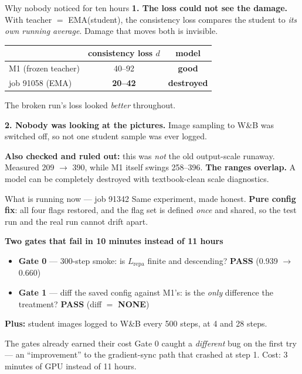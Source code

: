 \documentclass[10pt,aspectratio=169]{beamer}
\newcommand{\good}[1]{\textcolor{good}{\textbf{#1}}}
\newcommand{\bad}[1]{\textcolor{bad}{\textbf{#1}}}
\begin{document}
\begin{frame}{Why nobody noticed for ten hours}
  \textbf{1. The loss could not see the damage.}
  With teacher $=$ EMA(student), the consistency loss compares the student to
  \emph{its own running average}. Damage that moves both is invisible.

  \begin{center}
  \begin{tabular}{lcc}
    \toprule
    & consistency loss $d$ & model \\
    \midrule
    M1 (frozen teacher) & 40--92 & \good{good} \\
    job 91058 (EMA)     & \textbf{20--42} & \bad{destroyed} \\
    \bottomrule
  \end{tabular}
  \end{center}
  The broken run's loss looked \emph{better} throughout.

  \vspace{0.8em}
  \textbf{2. Nobody was looking at the pictures.} Image sampling to W\&B was switched off,
  so not one student sample was ever logged.

  \vspace{0.8em}
  \textbf{Also checked and ruled out:} this was \emph{not} the old output-scale runaway.
  Measured 209 $\to$ 390, while M1 itself swings 258--396. \textbf{The ranges overlap.}
  A model can be completely destroyed with textbook-clean scale diagnostics.
\end{frame}

\begin{frame}{What is running now --- job 91342}
  Same experiment, made honest. \textbf{Pure config fix}: all four flags restored, and the
  flag set is defined \emph{once} and shared, so the test run and the real run cannot drift apart.

  \vspace{0.6em}
  \textbf{Two gates that fail in 10 minutes instead of 11 hours}
  \begin{itemize}
    \item \textbf{Gate 0} --- 300-step smoke: is $L_{\text{repa}}$ finite and descending?
          \good{PASS} (0.939 $\to$ 0.660)
    \item \textbf{Gate 1} --- diff the saved config against M1's: is the \emph{only}
          difference the treatment? \good{PASS} (diff $=$ \textbf{NONE})
  \end{itemize}

  \vspace{0.6em}
  \textbf{Plus:} student images logged to W\&B every 500 steps, at 4 and 28 steps.

  \begin{alertblock}{The gates already earned their cost}
    Gate 0 caught a \emph{different} bug on the first try --- an ``improvement'' to the
    gradient-sync path that crashed at step 1. Cost: 3 minutes of GPU instead of 11 hours.
  \end{alertblock}
\end{frame}
\end{document}
